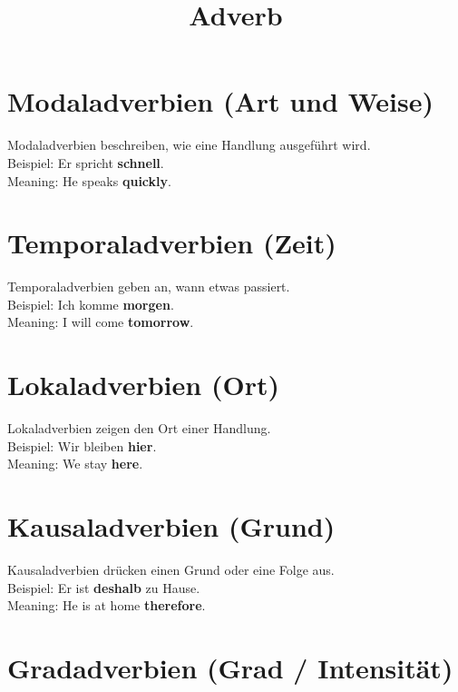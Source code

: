 \documentclass[a4paper]{article}
\title{Adverb}
\date{}
\begin{document}
    \maketitle
    
    
    \section{Modaladverbien (Art und Weise)}
        
        Modaladverbien beschreiben, wie eine Handlung ausgeführt wird.\\
        Beispiel: Er spricht \textbf{schnell}.\\
        Meaning: He speaks \textbf{quickly}.
    
    
    \section{Temporaladverbien (Zeit)}
        
        Temporaladverbien geben an, wann etwas passiert.\\
        Beispiel: Ich komme \textbf{morgen}.\\
        Meaning: I will come \textbf{tomorrow}.
    
    
    \section{Lokaladverbien (Ort)}
        
        Lokaladverbien zeigen den Ort einer Handlung.\\
        Beispiel: Wir bleiben \textbf{hier}.\\
        Meaning: We stay \textbf{here}.
    
    
    \section{Kausaladverbien (Grund)}
        
        Kausaladverbien drücken einen Grund oder eine Folge aus.\\
        Beispiel: Er ist \textbf{deshalb} zu Hause.\\
        Meaning: He is at home \textbf{therefore}.
    
    
    \section{Gradadverbien (Grad / Intensität)}
        
\end{document}
